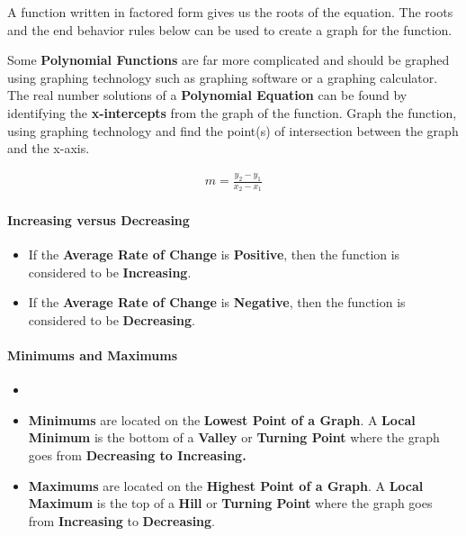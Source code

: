 
A function written in factored form gives us the roots of the equation. The roots and the end behavior rules below can be used to create a graph for the function.

Some \textbf{Polynomial Functions} are far more complicated and should be graphed
using graphing technology such as graphing software or a graphing calculator.
The real number solutions of a \textbf{Polynomial Equation} can be found by
identifying the \textbf{x-intercepts} from the graph of the function. Graph the
function, using graphing technology and find the point(s) of intersection
between the graph and the x-axis.

\begin{marginfigure}
    \centering
    \label{fig:graph-technology}
\end{marginfigure}

\begin{definition}
    \begin{align}
        m = \frac{y_2 - y_1}{x_2 - x_1}
    \end{align}
    
    \paragraph{Increasing versus Decreasing}
    
    \begin{itemize}
        \item If the \textbf{Average Rate of Change} is \textbf{Positive}, then the
          function is considered to be \textbf{Increasing}.
        \item If the \textbf{Average Rate of Change} is \textbf{Negative}, then the
          function is considered to be \textbf{Decreasing}.
    \end{itemize}
    
    \paragraph{Minimums and Maximums}
    
    \begin{itemize}
        \item
        \item \textbf{Minimums} are located on the \textbf{Lowest Point of a Graph}. A
          \textbf{Local Minimum} is the bottom of a \textbf{Valley} or
          \textbf{Turning Point} where the graph goes from \bf{Decreasing} to
          \textbf{Increasing}.
        \item \textbf{Maximums} are located on the \textbf{Highest Point of a Graph}. A
          \textbf{Local Maximum} is the top of a \textbf{Hill} or \textbf{Turning Point}
          where the graph goes from \textbf{Increasing} to \textbf{Decreasing}.
    \end{itemize}
\end{definition}

